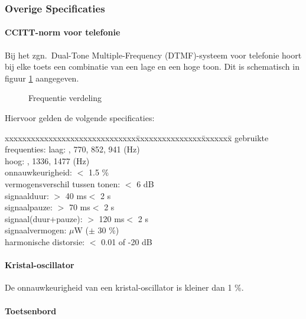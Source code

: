 \subsubsection{Overige Specificaties}

\paragraph{CCITT-norm voor telefonie}

Bij het zgn.\ Dual-Tone Multiple-Frequency (DTMF)-systeem voor telefonie hoort bij elke toets een combinatie van een lage en een hoge toon.
Dit is schematisch in figuur \ref{CCITT} aangegeven.

\begin{figure}[h]
\centerline{}
\caption{Frequentie verdeling}
\label{CCITT}
\end{figure}

Hiervoor gelden de volgende specificaties:
\begin{tabbing}
xxxxxxxxxxxxxxxxxxxxxxxxxxxxxx\=xxxxxxxxxxxxxxx\=xxxxxxx\=\kill
gebruikte frequenties: 	\>laag: 	, 770, 852, 941 (Hz)\\
			\>hoog:		, 1336, 1477 (Hz)\\
onnauwkeurigheid:	\>$<$ 1.5 \%	\\
vermogensverschil tussen tonen:  	\>$<$ 6 dB\\
signaalduur:		\>$>$ 40 ms\>$<$ 2 s\\
signaalpauze:		\>$>$ 70 ms\>$<$ 2 s\\
signaal(duur+pauze):	\>$>$ 120 ms\>$<$ 2 s\\
signaalvermogen:	 $\mu\!$W ($\pm$ 30 \%)\\
harmonische distorsie:	\>$<$ 0.01 of -20 dB\\
\end{tabbing}

\paragraph{Kristal-oscillator}

De onnauwkeurigheid van een kristal-oscillator is kleiner dan 1 \%.



\paragraph{Toetsenbord}

